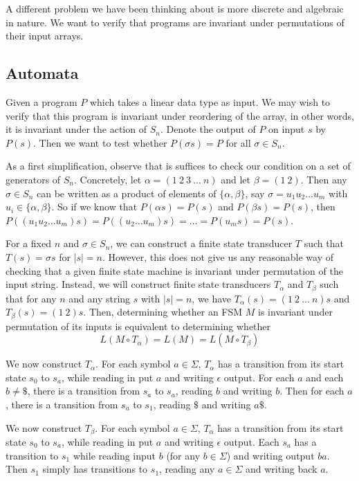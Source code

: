 \documentclass{llncs}
\begin{document}
A different problem we have been thinking about is more discrete and  algebraic in nature. We want to verify that programs are invariant under permutations of their input arrays.

\subsection{Automata}
Given a program $P$ which takes a linear data type
as input. We may wish to verify that this program
is invariant under reordering of the array,
in other words, it is invariant under the action of $S_n$.
Denote the output of $P$ on input $s$ by $P(s)$.
Then we want to test whether $P(\sigma s) = P$
for all $\sigma \in S_n$.

As a first simplification, observe that is
suffices to check our condition on a set
of generators of $S_n$.
Concretely, let $\alpha = (1\ 2\ 3\ ...\ n)$
and let $\beta = (1\ 2)$.
Then any $\sigma \in S_n$ can be written as
a product of elements of $\{\alpha,\beta\}$,
say $\sigma = u_1 u_2\ldots u_m$ with
$u_i \in \{\alpha,\beta\}$.
So if we know that $P(\alpha s) = P(s)$
and $P(\beta s) = P(s)$, then
$P((u_1 u_2 \ldots u_m)s)
= P((u_2 \ldots u_m)s)
= \ldots = P(u_ms) = P(s) $.

For a fixed $n$ and $\sigma \in S_n$,
we can construct a finite state transducer
$T$ such that $T(s) = \sigma s$ for $|s|=n$.
However, this does not give us any
reasonable way of checking that a given
finite state machine is invariant under permutation
of the input string.
Instead, we will construct finite state
transducers $T_{\alpha}$ and $T_{\beta}$
such that for any $n$ and any string $s$ 
with $|s|=n$, we have 
$T_{\alpha}(s)=(1\ 2\ \ldots\ n) s$ and
$T_{\beta}(s) = (1\ 2) s$.
Then, determining whether an FSM $M$ is
invariant under permutation of its inputs
is equivalent to determining whether
\[ 
  L(M \circ T_\alpha) = L(M) = L(M \circ T_\beta)
\]

We now construct $T_\alpha$.
For each symbol $a \in \Sigma$,
$T_\alpha$ has a transition from its start
state $s_0$ to $s_a$, while reading in put $a$ and 
writing $\epsilon$ output.
For each $a$ and each $b\ne \$$, there is a
transition from $s_a$ to $s_a$, reading $b$
and writing $b$.
Then for each $a$, there is a transition from 
$s_a$ to $s_1$, reading $\$$ and writing $a\$$.

We now construct $T_\beta$.
For each symbol $a \in \Sigma$,
$T_\alpha$ has a transition from its start
state $s_0$ to $s_a$, while reading in put $a$ and 
writing $\epsilon$ output.
Each $s_a$ has a transition to $s_1$ while
reading input $b$ (for any $b\in \Sigma$)
and writing output $ba$.
Then $s_1$ simply has transitions to $s_1$,
reading any $a\in \Sigma$ and writing
back $a$.
\end{document}
